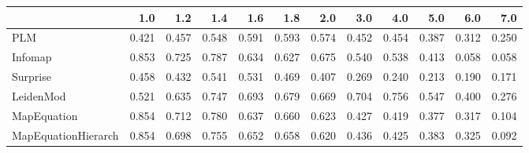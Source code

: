 \begin{tabular}{lrrrrrrrrrrr}
\toprule
{} &   1.0 &   1.2 &   1.4 &   1.6 &   1.8 &   2.0 &   3.0 &   4.0 &   5.0 &   6.0 &   7.0 \\
\midrule
PLM                 & 0.421 & 0.457 & 0.548 & 0.591 & 0.593 & 0.574 & 0.452 & 0.454 & 0.387 & 0.312 & 0.250 \\
Infomap             & 0.853 & 0.725 & 0.787 & 0.634 & 0.627 & 0.675 & 0.540 & 0.538 & 0.413 & 0.058 & 0.058 \\
Surprise            & 0.458 & 0.432 & 0.541 & 0.531 & 0.469 & 0.407 & 0.269 & 0.240 & 0.213 & 0.190 & 0.171 \\
LeidenMod           & 0.521 & 0.635 & 0.747 & 0.693 & 0.679 & 0.669 & 0.704 & 0.756 & 0.547 & 0.400 & 0.276 \\
MapEquation         & 0.854 & 0.712 & 0.780 & 0.637 & 0.660 & 0.623 & 0.427 & 0.419 & 0.377 & 0.317 & 0.104 \\
MapEquationHierarch & 0.854 & 0.698 & 0.755 & 0.652 & 0.658 & 0.620 & 0.436 & 0.425 & 0.383 & 0.325 & 0.092 \\
\bottomrule
\end{tabular}
